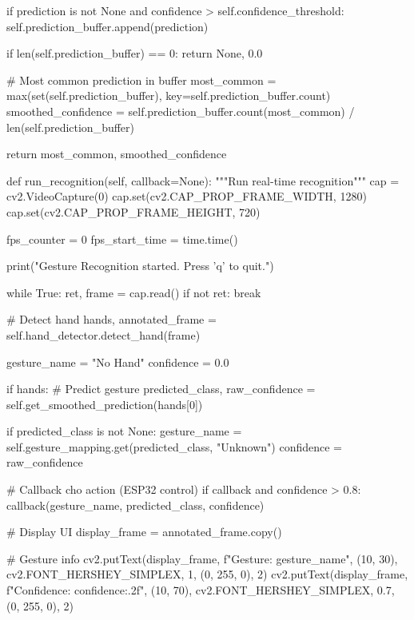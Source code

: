 \begin{aivncodebox}
\begin{python}
        if prediction is not None and confidence > self.confidence_threshold:
            self.prediction_buffer.append(prediction)
        
        if len(self.prediction_buffer) == 0:
            return None, 0.0
        
        # Most common prediction in buffer
        most_common = max(set(self.prediction_buffer), 
                         key=self.prediction_buffer.count)
        smoothed_confidence = self.prediction_buffer.count(most_common) / len(self.prediction_buffer)
        
        return most_common, smoothed_confidence
    
    def run_recognition(self, callback=None):
        """Run real-time recognition"""
        cap = cv2.VideoCapture(0)
        cap.set(cv2.CAP_PROP_FRAME_WIDTH, 1280)
        cap.set(cv2.CAP_PROP_FRAME_HEIGHT, 720)
        
        fps_counter = 0
        fps_start_time = time.time()
        
        print("Gesture Recognition started. Press 'q' to quit.")
        
        while True:
            ret, frame = cap.read()
            if not ret:
                break
            
            # Detect hand
            hands, annotated_frame = self.hand_detector.detect_hand(frame)
            
            gesture_name = "No Hand"
            confidence = 0.0
            
            if hands:
                # Predict gesture
                predicted_class, raw_confidence = self.get_smoothed_prediction(hands[0])
                
                if predicted_class is not None:
                    gesture_name = self.gesture_mapping.get(predicted_class, "Unknown")
                    confidence = raw_confidence
                    
                    # Callback cho action (ESP32 control)
                    if callback and confidence > 0.8:
                        callback(gesture_name, predicted_class, confidence)
            
            # Display UI
            display_frame = annotated_frame.copy()
            
            # Gesture info
            cv2.putText(display_frame, f"Gesture: {gesture_name}", (10, 30),
                       cv2.FONT_HERSHEY_SIMPLEX, 1, (0, 255, 0), 2)
            cv2.putText(display_frame, f"Confidence: {confidence:.2f}", (10, 70),
                       cv2.FONT_HERSHEY_SIMPLEX, 0.7, (0, 255, 0), 2)
            

\end{python}
\end{aivncodebox}
